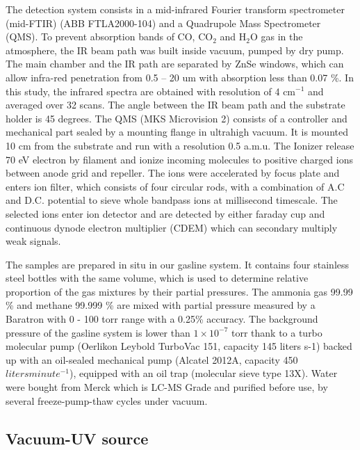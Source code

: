 The detection system consists in a mid-infrared Fourier transform spectrometer (mid-FTIR) (ABB FTLA2000-104) and a Quadrupole Mass Spectrometer (QMS). To prevent absorption bands of CO, CO$_2$ and H$_2$O gas in the atmosphere, the IR beam path was built inside vacuum, pumped by dry pump. The main chamber and the IR path are separated by ZnSe windows, which can allow infra-red penetration from 0.5 – 20 um with absorption less than 0.07 \%. In this study, the infrared spectra are obtained with resolution of 4 cm$^{-1}$ and averaged over 32 scans. The angle between the IR beam path and the substrate holder is 45 degrees. The QMS (MKS Microvision 2) consists of a controller and mechanical part sealed by a mounting flange in ultrahigh vacuum. It is mounted 10 cm from the substrate and run with a resolution 0.5 a.m.u. The Ionizer release 70 eV electron by filament and ionize incoming molecules to positive charged ions between anode grid and repeller. The ions were accelerated by focus plate and enters ion filter, which consists of four circular rods, with a combination of A.C and D.C. potential to sieve whole bandpass ions at millisecond timescale. The selected ions enter ion detector and are detected by either faraday cup and continuous dynode electron multiplier (CDEM) which can secondary multiply weak signals.

The samples are prepared in situ in our gasline system. It contains four stainless steel bottles with the same volume, which is used to determine relative proportion of the gas mixtures by their partial pressures. The ammonia gas 99.99 \% and methane 99.999 \% are mixed with partial pressure measured by a Baratron with 0 - 100 torr range with a 0.25\% accuracy. The background pressure of the gasline system is lower than $1 \times 10^{-7}$ torr thank to a turbo molecular pump (Oerlikon Leybold TurboVac 151, capacity 145 liters s-1) backed up with an oil-sealed mechanical pump (Alcatel 2012A, capacity 450 $liters minute^{-1}$), equipped with an oil trap (molecular sieve type 13X). Water were bought from Merck which is LC-MS Grade and purified before use, by several freeze-pump-thaw cycles under vacuum.

\subsection{Vacuum-UV source}
\label{sec:Vacuum_UV_source}

